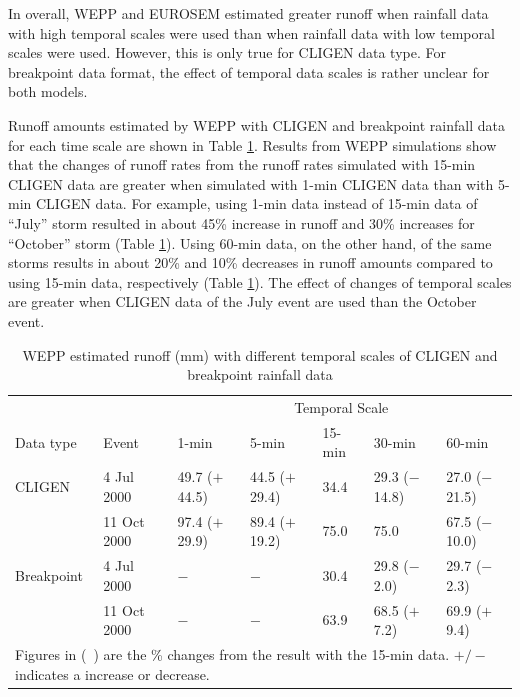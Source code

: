 In overall, WEPP and EUROSEM estimated greater runoff when rainfall data
with high temporal scales were used than when rainfall data with low temporal
scales were used. However, this is only true for CLIGEN data type. For
breakpoint data format, the effect of temporal data scales is rather unclear for
both models.

Runoff amounts estimated by WEPP with CLIGEN and breakpoint rainfall data for
each time scale are shown in Table
\ref{tab:DifferentTemporalScalesOfRainfallDataOnWEPPRunoffEstimation}. Results
from WEPP simulations show that the changes of runoff rates from the runoff
rates simulated with 15-min CLIGEN data are greater when simulated with 1-min
CLIGEN data than with 5-min CLIGEN data. For example, using 1-min data instead
of 15-min data of ``July'' storm resulted in about 45\% increase in runoff and
30\% increases for ``October'' storm (Table
\ref{tab:DifferentTemporalScalesOfRainfallDataOnWEPPRunoffEstimation}). Using
60-min data, on the other hand, of the same storms results in about 20\% and
10\% decreases in runoff amounts compared to using 15-min data, respectively
(Table \ref{tab:DifferentTemporalScalesOfRainfallDataOnWEPPRunoffEstimation}).
The effect of changes of temporal scales are greater when CLIGEN data of the
July event are used than the October event.

\begin{table}[htbp]
  \centering
  \footnotesize
  \caption[WEPP estimated runoff with different temporal scales of CLIGEN and
breakpoint rainfall data]{WEPP estimated runoff (mm) with different temporal
scales of CLIGEN and breakpoint rainfall data}
  \label{tab:DifferentTemporalScalesOfRainfallDataOnWEPPRunoffEstimation}
    \begin{tabular}{lllllll}
      \toprule
      & & \multicolumn{5}{c}{Temporal Scale}\\
      \cmidrule{3-7}
      Data type & Event & 1-min & 5-min & 15-min & 30-min & 60-min \\
      \midrule
      CLIGEN & 4 Jul 2000 & 49.7 ($+$44.5) & 44.5 ($+$29.4) & 34.4 & 29.3
($-$14.8) & 27.0 ($-$21.5) \\
       & 11 Oct 2000 & 97.4 ($+$29.9) & 89.4 ($+$19.2) & 75.0 & 75.0 & 67.5
($-$10.0) \\
       \midrule
      Breakpoint & 4 Jul 2000 & $-$ & $-$ & 30.4 & 29.8 ($-$2.0) & 29.7
($-$2.3)\\
       & 11 Oct 2000 & $-$ & $-$ & 63.9 & 68.5 ($+$7.2) & 69.9 ($+$9.4)\\
      \bottomrule
      \multicolumn{7}{p{12cm}}{\footnotesize Figures in (\ ) are the \% changes
from the result with the 15-min data. $+/-$ indicates a increase or decrease.}\\
    \end{tabular}
\end{table}

